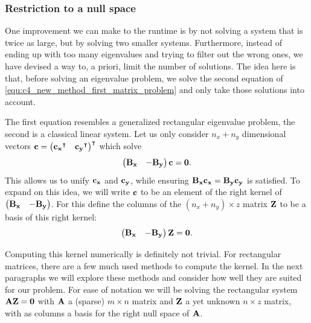 \subsubsection{Restriction to a null space}\label{sec:nm_by_restriction}

One improvement we can make to the runtime is by not solving a system that is twice as large, but by solving two smaller systems. Furthermore, instead of ending up with too many eigenvalues and trying to filter out the wrong ones, we have devised a way to, a priori, limit the number of solutions. The idea here is that, before solving an eigenvalue problem, we solve the second equation of \eqref{equ:c4_new_method_first_matrix_problem} and only take those solutions into account.

The first equation resembles a generalized rectangular eigenvalue problem, the second is a classical linear system. Let us only consider $n_x + n_y$ dimensional vectors $\vb{c} = {\begin{pmatrix}{\vb{c_x}}^\intercal & {\vb{c_y}}^\intercal \end{pmatrix}}^\intercal$ which solve
$$
    \begin{pmatrix}\vb{B_x} & -\vb{B_y} \end{pmatrix} \vb{c} = \vb{0}\text{.}
$$
This allows us to unify $\vb{c_x}$ and $\vb{c_y}$, while ensuring $\vb{B_x} \vb{c_x} = \vb{B_y} \vb{c_y}$ is satisfied. To expand on this idea, we will write $\vb{c}$ to be an element of the right kernel of  $\begin{pmatrix}\vb{B_x} & -\vb{B_y} \end{pmatrix}$. For this define the columns of the $(n_x + n_y) \times z$ matrix $\vb{Z}$ to be a basis of this right kernel:
\begin{equation}\label{equ:c4_null_space_kernel}
    \begin{pmatrix}\vb{B_x} & -\vb{B_y} \end{pmatrix} \vb{Z} = \vb{0}\text{.}
\end{equation}

Computing this kernel numerically is definitely not trivial. For rectangular matrices, there are a few much used methods to compute the kernel. In the next paragraphs we will explore these methods and consider how well they are suited for our problem. For ease of notation we will be solving the rectangular system $\vb{A} \vb{Z} = \vb{0}$ with $\vb{A}$ a (sparse) $m\times n$ matrix and $\vb{Z}$ a yet unknown $n \times z$ matrix, with as columns a basis for the right null space of $\vb{A}$.

